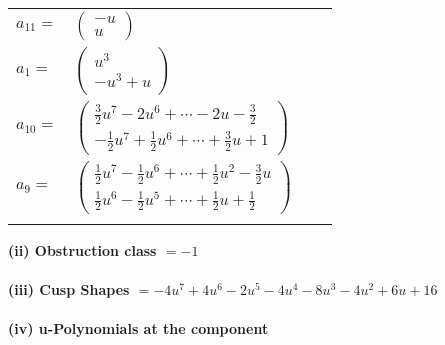 \documentclass[1p]{elsarticle_modified}
\theoremstyle{definition}
\begin{document}
\begin{tabular}{m{7pt} m{180pt} m{7pt} m{180pt} }
\flushright $a_{11}=$&$\begin{pmatrix}- u\\u\end{pmatrix}$ \\
\flushright $a_{1}=$&$\begin{pmatrix}u^3\\- u^3+u\end{pmatrix}$ \\
\flushright $a_{10}=$&$\begin{pmatrix}\frac{3}{2} u^7-2 u^6+\cdots-2 u-\frac{3}{2}\\-\frac{1}{2} u^7+\frac{1}{2} u^6+\cdots+\frac{3}{2} u+1\end{pmatrix}$ \\
\flushright $a_{9}=$&$\begin{pmatrix}\frac{1}{2} u^7-\frac{1}{2} u^6+\cdots+\frac{1}{2} u^2-\frac{3}{2} u\\\frac{1}{2} u^6-\frac{1}{2} u^5+\cdots+\frac{1}{2} u+\frac{1}{2}\end{pmatrix}$\\&\end{tabular}
\flushleft \textbf{(ii) Obstruction class $= -1$}\\~\\
\flushleft \textbf{(iii) Cusp Shapes $= -4 u^7+4 u^6-2 u^5-4 u^4-8 u^3-4 u^2+6 u+16$}\\~\\
\newpage\renewcommand{\arraystretch}{1}
\flushleft \textbf{(iv) u-Polynomials at the component}\newline \\
\end{document}
